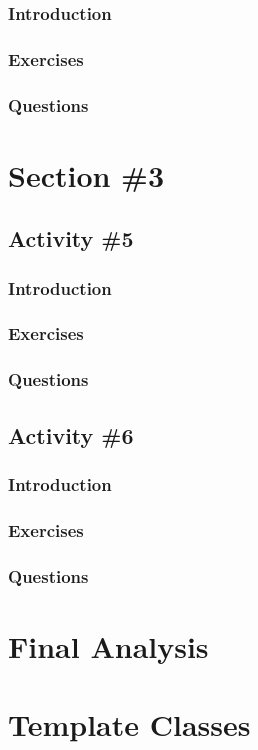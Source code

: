       \subsubsection{Introduction}
      \subsubsection{Exercises}
      \subsubsection{Questions}


  \pagebreak
  
  \section{Section \#3}
    \subsection{Activity \#5} %
      \subsubsection{Introduction}
      \subsubsection{Exercises}
      \subsubsection{Questions}

    \subsection{Activity \#6} %
      \subsubsection{Introduction}
      \subsubsection{Exercises}
      \subsubsection{Questions}

  \pagebreak

  \section{Final Analysis}

  \pagebreak

  \section{Template Classes}
